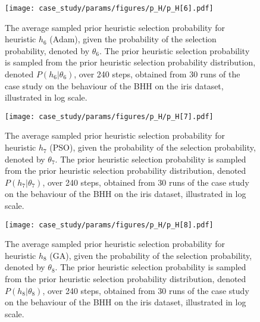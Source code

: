 \begin{figure}[htpb]
	\centering
	\texttt{[image: case\_study/params/figures/p\_H/p\_H[6].pdf]}
	\caption{The average sampled prior heuristic selection probability for heuristic $h_{6}$ (\acs{Adam}), given the probability of the selection probability, denoted by $\theta_{6}$. The prior heuristic selection probability is sampled from the prior heuristic selection probability distribution, denoted $P(h_{6} \vert \theta_{6})$, over 240 steps, obtained from 30 runs of the case study on the behaviour of the \acs{BHH} on the iris dataset, illustrated in log scale.}
	\label{fig:results:case_study:p_H:6}
\end{figure}

\begin{figure}[htpb]
	\centering
	\texttt{[image: case\_study/params/figures/p\_H/p\_H[7].pdf]}
	\caption{The average sampled prior heuristic selection probability for heuristic $h_{7}$ (\acs{PSO}), given the probability of the selection probability, denoted by $\theta_{7}$. The prior heuristic selection probability is sampled from the prior heuristic selection probability distribution, denoted $P(h_{7} \vert \theta_{7})$, over 240 steps, obtained from 30 runs of the case study on the behaviour of the \acs{BHH} on the iris dataset, illustrated in log scale.}
	\label{fig:results:case_study:p_H:7}
\end{figure}

\begin{figure}[htpb]
	\centering
	\texttt{[image: case\_study/params/figures/p\_H/p\_H[8].pdf]}
	\caption{The average sampled prior heuristic selection probability for heuristic $h_{8}$ (\acs{GA}), given the probability of the selection probability, denoted by $\theta_{8}$. The prior heuristic selection probability is sampled from the prior heuristic selection probability distribution, denoted $P(h_{8} \vert \theta_{8})$, over 240 steps, obtained from 30 runs of the case study on the behaviour of the \acs{BHH} on the iris dataset, illustrated in log scale.}
	\label{fig:results:case_study:p_H:8}
\end{figure}


